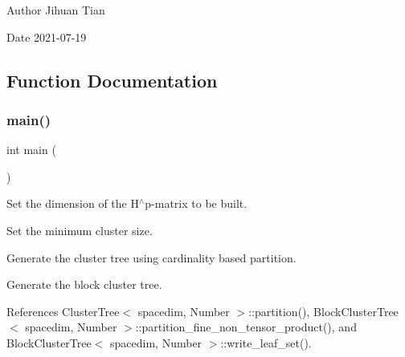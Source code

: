 \begin{DoxyAuthor}{Author}
Jihuan Tian 
\end{DoxyAuthor}
\begin{DoxyDate}{Date}
2021-\/07-\/19 
\end{DoxyDate}


\subsection{Function Documentation}
\mbox{\label{bct-subtree_8cc_ae66f6b31b5ad750f1fe042a706a4e3d4}} 
\subsubsection{\texorpdfstring{main()}{main()}}
{\footnotesize\ttfamily int main (\begin{DoxyParamCaption}{ }\end{DoxyParamCaption})}

Set the dimension of the H$^\wedge$p-\/matrix to be built.

Set the minimum cluster size.

Generate the cluster tree using cardinality based partition.

Generate the block cluster tree.

References Cluster\+Tree$<$ spacedim, Number $>$\+::partition(), Block\+Cluster\+Tree$<$ spacedim, Number $>$\+::partition\+\_\+fine\+\_\+non\+\_\+tensor\+\_\+product(), and Block\+Cluster\+Tree$<$ spacedim, Number $>$\+::write\+\_\+leaf\+\_\+set().

